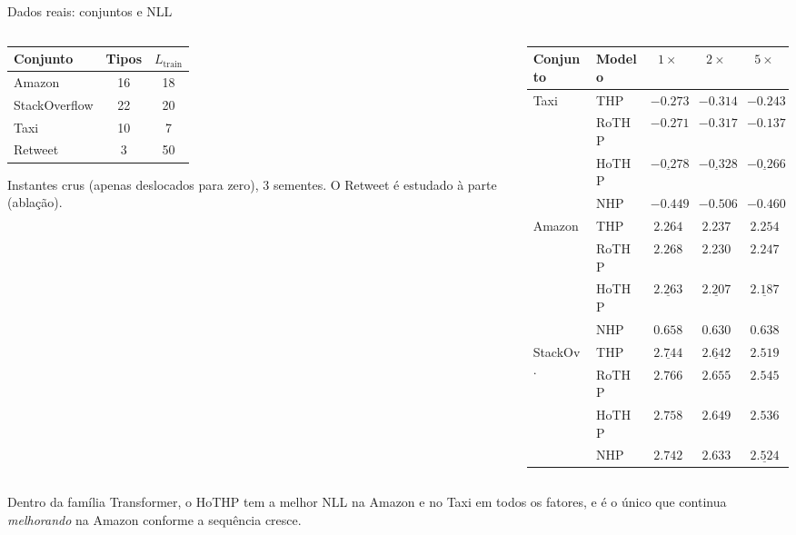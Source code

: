 \documentclass[aspectratio=169,9pt]{beamer}
\begin{document}
\begin{frame}{Dados reais: conjuntos e NLL}
  \begin{columns}[T]
    \begin{column}{0.36\textwidth}
      {\scriptsize
      \begin{tabular}{lcc}
        \toprule
        Conjunto & Tipos & $L_{\text{train}}$ \\
        \midrule
        Amazon        & 16 & 18 \\
        StackOverflow & 22 & 20 \\
        Taxi          & 10 & 7  \\
        Retweet       & 3  & 50 \\
        \bottomrule
      \end{tabular}}
      \vspace{0.6em}

      {\scriptsize Instantes crus (apenas deslocados para zero), 3 sementes. O
      Retweet é estudado à parte (ablação).}
    \end{column}
    \begin{column}{0.62\textwidth}
      {\scriptsize
      \begin{tabular}{llccc}
        \toprule
        Conjunto & Modelo & $1\times$ & $2\times$ & $5\times$ \\
        \midrule
        \multirow{4}{*}{Taxi}
          & THP   & $-0.273$ & $-0.314$ & $-0.243$ \\
          & RoTHP & $-0.271$ & $-0.317$ & $-0.137$ \\
          & HoTHP & $\underline{-0.278}$ & $\underline{-0.328}$ & $\underline{-0.266}$ \\
          & NHP   & $\mathbf{-0.449}$ & $\mathbf{-0.506}$ & $\mathbf{-0.460}$ \\
        \midrule
        \multirow{4}{*}{Amazon}
          & THP   & $2.264$ & $2.237$ & $2.254$ \\
          & RoTHP & $2.268$ & $2.230$ & $2.247$ \\
          & HoTHP & $\underline{2.263}$ & $\underline{2.207}$ & $\underline{2.187}$ \\
          & NHP   & $\mathbf{0.658}$ & $\mathbf{0.630}$ & $\mathbf{0.638}$ \\
        \midrule
        \multirow{4}{*}{StackOv.}
          & THP   & $\underline{2.744}$ & $\underline{2.642}$ & $\mathbf{2.519}$ \\
          & RoTHP & $2.766$ & $2.655$ & $2.545$ \\
          & HoTHP & $2.758$ & $2.649$ & $2.536$ \\
          & NHP   & $\mathbf{2.742}$ & $\mathbf{2.633}$ & $\underline{2.524}$ \\
        \bottomrule
      \end{tabular}}
    \end{column}
  \end{columns}
  \vspace{0.3em}
  {\small Dentro da família Transformer, o HoTHP tem a melhor NLL na Amazon e no
  Taxi em todos os fatores, e é o único que continua \emph{melhorando} na Amazon
  conforme a sequência cresce.}
\end{frame}
\end{document}
